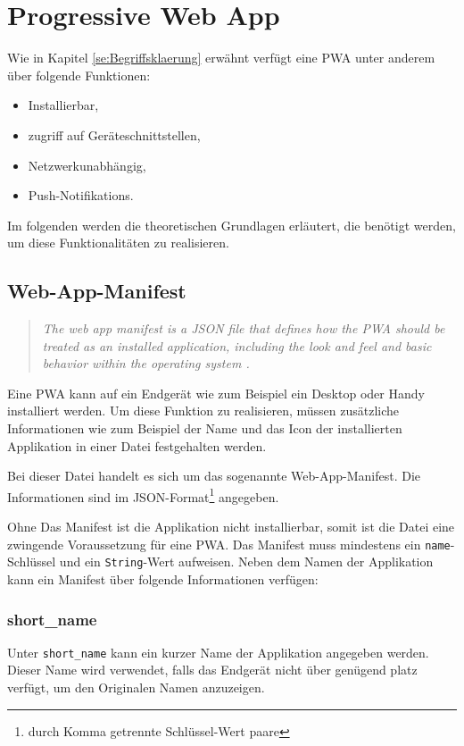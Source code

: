 
\chapter{Progressive Web App}

Wie in Kapitel \ref{se:Begriffsklaerung} erwähnt verfügt eine PWA unter anderem über folgende Funktionen: 
\begin{itemize}
    \item Installierbar,
    \item zugriff auf Geräteschnittstellen, 
    \item Netzwerkunabhängig,
    \item Push-Notifikations.
\end{itemize} 

Im folgenden werden die theoretischen Grundlagen erläutert, die benötigt werden, um diese Funktionalitäten zu realisieren. 


\section{Web-App-Manifest}\label{sec:webappmanifest}

\begin{quote}
   \textit{The web app manifest is a JSON file that defines how the PWA should be treated as an installed application, including the look and feel and basic behavior within the operating system \cite{Developers2022}. }
\end{quote}

Eine PWA kann auf ein Endgerät wie zum Beispiel ein Desktop oder Handy installiert werden. Um diese Funktion zu realisieren, müssen zusätzliche Informationen wie zum Beispiel der Name und das Icon der installierten Applikation in einer Datei festgehalten werden. 

Bei dieser Datei handelt es sich um das sogenannte Web-App-Manifest. Die Informationen sind im \ac{JSON}-Format\footnote{durch Komma getrennte Schlüssel-Wert paare} angegeben. 

Ohne Das Manifest ist die Applikation nicht installierbar, somit ist die Datei eine zwingende Voraussetzung für eine PWA. 
Das Manifest muss mindestens ein \texttt{name}-Schlüssel und ein \texttt{String}-Wert aufweisen. 
Neben dem Namen der Applikation kann ein Manifest über folgende Informationen verfügen: 

\subsection{short\_name}
Unter \texttt{short\_name} kann ein kurzer Name der Applikation angegeben werden. Dieser Name wird verwendet, falls das Endgerät nicht über genügend platz verfügt, um den Originalen Namen anzuzeigen. 

